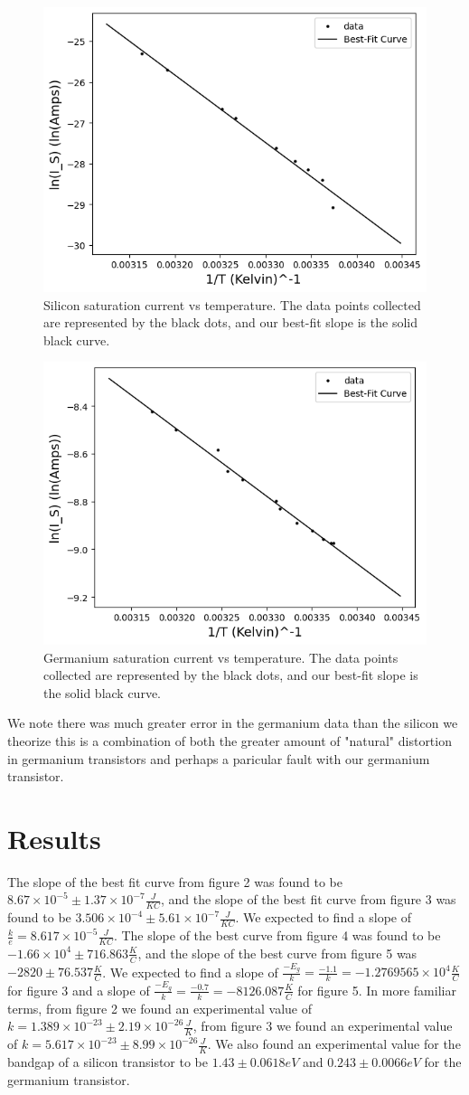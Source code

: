 \documentclass[12pt,letterpaper,twocolumn]{article}
\begin{document}
\begin{figure}[h]
	\includegraphics[width = .5\textwidth]{linSiSatCurrent.png}
	\caption{Silicon saturation current vs temperature. The data points collected are represented by the black dots, and our best-fit slope is the solid black curve.\label{g3}}
\end{figure}
\begin{figure}[h]
	\includegraphics[width = .5\textwidth]{linGeSatCurrent.png}
	\caption{Germanium saturation current vs temperature. The data points collected are represented by the black dots, and our best-fit slope is the solid black curve.\label{g4}}
\end{figure}
We note there was much greater error in the germanium data than the silicon we theorize this is a combination of both the greater amount of "natural" distortion in germanium transistors and perhaps a paricular fault with our germanium transistor.

\section{Results}
The slope of the best fit curve from figure 2 was found to be $8.67 \times 10^{-5} \pm 1.37 \times 10^{-7} \frac{J}{KC}$, and the slope of the best fit curve from figure 3 was found to be $3.506 \times 10^{-4} \pm 5.61\times 10^{-7}\frac{J}{KC}$. We expected to find a slope of $\frac{k}{e} = 8.617 \times 10^{-5}\frac{J}{KC}$. The slope of the best curve from figure 4 was found to be $-1.66 \times 10^{4} \pm 716.863 \frac{K}{C}$, and the slope of the best curve from figure 5 was $-2820 \pm 76.537 \frac{K}{C}$. We expected to find a slope of $\frac{-E_g}{k} = \frac{-1.1}{k} = -1.2769565 \times 10^{4} \frac{K}{C}$ for figure 3 and a slope of $\frac{-E_g}{k} = \frac{-0.7}{k} = -8126.087 \frac{K}{C}$ for figure 5.
In more familiar terms, from figure 2 we found an experimental value of $k = 1.389 \times 10^{-23} \pm 2.19 \times 10^{-26} \frac{J}{K}$, from figure 3 we found an experimental value of $k = 5.617\times 10^{-23} \pm 8.99 \times 10^{-26}\frac{J}{K}$. We also found an experimental value for the bandgap of a silicon transistor to be $1.43 \pm 0.0618 eV$ and $0.243 \pm 0.0066 eV$ for the germanium transistor.
\end{document}
